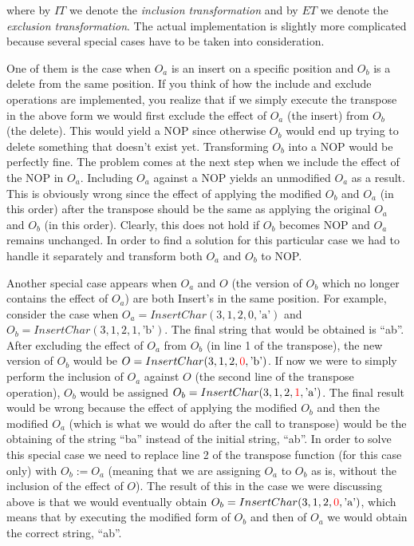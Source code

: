 \noindent{}where by $IT$ we denote the \emph{inclusion transformation} and by $ET$ we
denote the \emph{exclusion transformation}. The actual implementation is slightly more
complicated because several special cases have to be taken into consideration.

One of them is the case when $O_{a}$ is an insert on a specific position and $O_{b}$
is a delete from the same position. If you think of how the include and exclude operations
are implemented, you realize that if we simply execute the transpose in the above form
we would first exclude the effect of $O_{a}$ (the insert) from $O_{b}$ (the delete). This
would yield a NOP since otherwise $O_{b}$ would end up trying to delete something that
doesn't exist yet. Transforming $O_{b}$ into a NOP would be perfectly fine. The problem
comes at the next step when we include the effect of the NOP in $O_{a}$. Including $O_{a}$
against a NOP yields an unmodified $O_{a}$ as a result. This is obviously wrong since the
effect of applying the modified $O_{b}$ and $O_{a}$ (in this order) after the transpose
should be the same as applying the original $O_{a}$ and $O_{b}$ (in this order). Clearly,
this does not hold if $O_{b}$ becomes NOP and $O_{a}$ remains unchanged. In order to find a
solution for this particular case we had to handle it separately and transform both
$O_{a}$ and $O_{b}$ to NOP.

Another special case appears when $O_{a}$ and $O$ (the version of $O_{b}$ which no longer
contains the effect of $O_{a}$) are both Insert's in the same position. For example,
consider the case when $O_{a}=InsertChar(3,1,2,0,\text{'a'})$ and $O_{b}=InsertChar(3,1,2,1,\text{'b'})$.
The final string that would be obtained is ``ab''. After excluding the effect of $O_{a}$
from $O_{b}$ (in line 1 of the transpose), the new version of $O_{b}$ would be
$O=InsertChar(3,1,2,\textcolor{red}{0},\text{'b'})$. If now we were to simply perform
the inclusion of $O_{a}$ against $O$ (the second line of the transpose operation), $O_{b}$
would be assigned $O_{b}=InsertChar(3,1,2,\textcolor{red}{1},\text{'a'})$.
The final result would be wrong because the effect of applying the modified $O_{b}$
and then the modified $O_{a}$ (which is what we would do after the call to transpose) would be
the obtaining of the string ``ba'' instead of the initial string, ``ab''. In order
to solve this special case we need to replace line 2 of the transpose function
(for this case only) with $O_{b} := O_{a}$ (meaning that we are assigning $O_{a}$ to
$O_{b}$ as is, without the inclusion of the effect of $O$). The result of this in the
case we were discussing above is that we would eventually obtain
$O_{b}=InsertChar(3,1,2,\textcolor{red}{0},\text{'a'})$, which means that by
executing the modified form of $O_{b}$ and then of $O_{a}$ we would obtain
the correct string, ``ab''.

